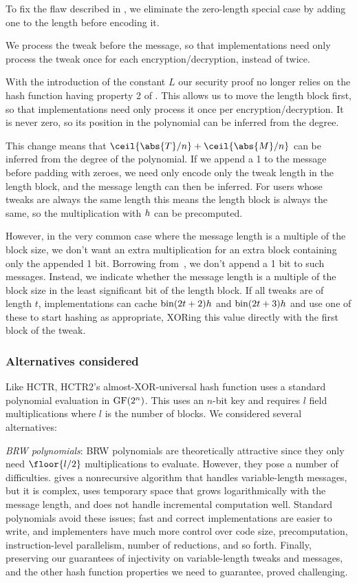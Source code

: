 \documentclass[hctr2.tex]{subfiles}
\begin{document}
To fix the flaw described in \cite{kumarhctr},
we eliminate the zero-length special case
by adding one to the length before encoding it.

We process the tweak before the message, so that implementations need only
process the tweak once for each encryption/decryption, instead of twice.

With the introduction of the constant \(L\)
our security proof no longer relies on the hash function
having property 2 of \cite[Section~3.3]{hctr}.
This allows us to move the length block first, so
that implementations need only process it once per encryption/decryption.
It is never zero, so its position in the
polynomial can be inferred from the degree.

This change means that \(\ceil{\abs{T}/n} + \ceil{\abs{M}/n}\)
can be inferred from the degree of the polynomial.  
If we append a 1 to the message before padding with zeroes,
we need only encode only the tweak length in the length block,
and the message length can then be inferred.
For users whose tweaks are always the same length
this means the length block is always the same, 
so the multiplication with \(h\) can be
precomputed.

However, in the very common case where 
the message length is a multiple of the block size,
we don't want an extra multiplication
for an extra block containing only the appended 1 bit.
Borrowing from~\cite{xcbc},
we don't append a 1 bit to such messages.
Instead, we indicate whether
the message length is a multiple of the block size
in the least significant bit of the length block.
If all tweaks are of length \(t\), implementations can cache
\(\operatorname{bin}(2t + 2)h\) and \(\operatorname{bin}(2t + 3)h\)
and use one of these to start hashing as appropriate,
XORing this value directly with the first block of the tweak.

\subsubsection{Alternatives considered}

Like HCTR, HCTR2's almost-XOR-universal hash function uses a standard polynomial
evaluation in $\operatorname{GF}(2^n)$. This uses an $n$-bit key and requires $l$ field
multiplications where $l$ is the number of blocks.
We considered several alternatives:

\emph{BRW polynomials}: BRW polynomials\cite{pema}\cite{heh2} are theoretically
attractive since they only need \(\floor{l/2}\) multiplications
to evaluate. However, they pose a number of difficulties. \cite{brweval} gives a
nonrecursive algorithm that handles variable-length messages, but it is complex,
uses temporary space that grows logarithmically with the message length,
and does not handle incremental computation well.
Standard polynomials avoid these issues;
fast and correct implementations are easier to write,
and implementers have much more control over
code size, precomputation, instruction-level
parallelism, number of reductions, and so forth.
Finally, preserving our guarantees of injectivity on variable-length
tweaks and messages, and the other hash function properties we need
to guarantee, proved challenging.
\end{document}
